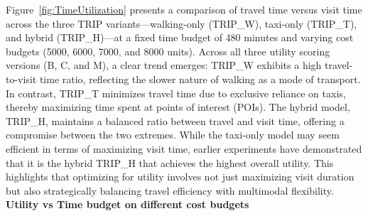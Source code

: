 Figure~\ref{fig:TimeUtilization} presents a comparison of travel time versus visit time across the three TRIP variants---walking-only (TRIP\_W), taxi-only (TRIP\_T), and hybrid (TRIP\_H)---at a fixed time budget of 480 minutes and varying cost budgets (5000, 6000, 7000, and 8000 units). Across all three utility scoring versions (B, C, and M), a clear trend emerges: TRIP\_W exhibits a high travel-to-visit time ratio, reflecting the slower nature of walking as a mode of transport. In contrast, TRIP\_T minimizes travel time due to exclusive reliance on taxis, thereby maximizing time spent at points of interest (POIs). The hybrid model, TRIP\_H, maintains a balanced ratio between travel and visit time, offering a compromise between the two extremes. While the taxi-only model may seem efficient in terms of maximizing visit time, earlier experiments have demonstrated that it is the hybrid TRIP\_H that achieves the highest overall utility. This highlights that optimizing for utility involves not just maximizing visit duration but also strategically balancing travel efficiency with multimodal flexibility.\\

\noindent\textbf{Utility vs Time budget on different cost budgets}

